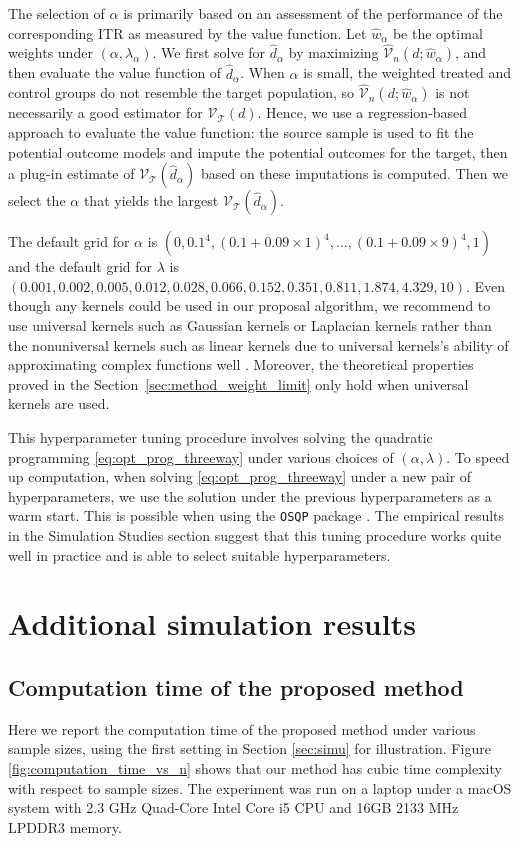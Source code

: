 \documentclass[12pt]{article}
\begin{document}
The selection of $\alpha$ is primarily based on an assessment of the performance of the corresponding ITR as measured by the value function. Let $\hat{w}_\alpha$ be the optimal weights under $(\alpha, \lambda_\alpha)$. We first solve for $\hat{d}_\alpha$ by maximizing $\widehat{\mathcal{V}}_n(d; \hat{w}_\alpha)$, and then evaluate the value function of $\hat{d}_\alpha$. When $\alpha$ is small, the weighted treated and control groups do not resemble the target population, so $\widehat{\mathcal{V}}_n(d; \hat{w}_\alpha)$ is not necessarily a good estimator for $\mathcal{V}_\mathcal{T}(d)$. Hence, we use a regression-based approach to evaluate the value function: the source sample is used to fit the potential outcome models and impute the potential outcomes for the target, then a plug-in estimate of $\mathcal{V}_\mathcal{T}(\hat{d}_\alpha)$ based on these imputations is computed. Then we select the $\alpha$ that yields the largest $\mathcal{V}_\mathcal{T}(\hat{d}_\alpha)$.

The default grid for $\alpha$ is $(0,0.1^4,(0.1+0.09 \times 1)^4,\ldots, (0.1+0.09 \times 9)^4,1) $ and the default grid for $\lambda$ is $(0.001, 0.002,0.005,0.012,0.028,0.066,0.152,0.351,0.811,1.874,4.329, 10)$.  Even though any kernels could be used in our proposal algorithm, we recommend to use universal kernels such as Gaussian kernels or Laplacian kernels rather than the nonuniversal kernels such as linear kernels due to universal kernels's ability of approximating complex functions well \citep{simon2018kernel}. Moreover, the theoretical properties proved in the Section~\ref{sec:method_weight_limit} only hold when universal kernels are used.

This hyperparameter tuning procedure involves solving the quadratic programming \eqref{eq:opt_prog_threeway} under various choices of $(\alpha, \lambda)$. To speed up computation, when solving \eqref{eq:opt_prog_threeway} under a new pair of hyperparameters, we use the solution under the previous hyperparameters as a warm start. This is possible when using the \texttt{OSQP} package \citep{osqp}. The empirical results in the Simulation Studies section suggest that this tuning procedure works quite well in practice and is able to select suitable hyperparameters.



\section{Additional simulation results}
\subsection{Computation time of the proposed method}
Here we report the computation time of the proposed method under various sample sizes, using the first setting in Section \ref{sec:simu} for illustration. Figure \ref{fig:computation_time_vs_n} shows that our method has cubic time complexity with respect to sample sizes. The experiment was run on a laptop under a macOS system with 2.3 GHz Quad-Core Intel Core i5 CPU and 16GB 2133 MHz LPDDR3 memory. 
\end{document}
